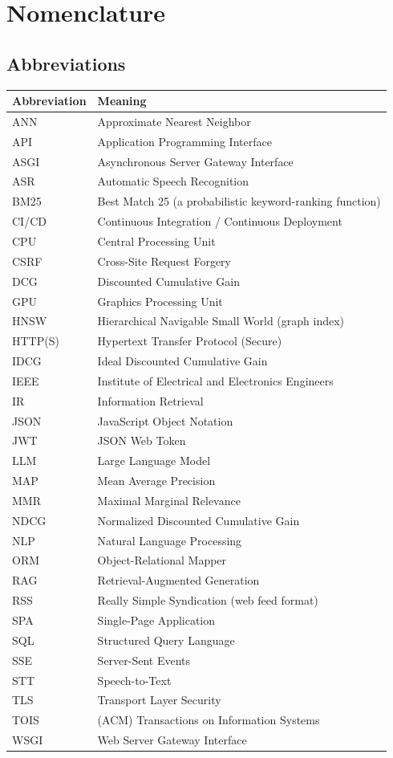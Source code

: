 \chapter*{Nomenclature}

\section*{Abbreviations}
\begin{longtable}{@{}p{4cm}p{10cm}@{}}
\toprule
\textbf{Abbreviation} & \textbf{Meaning} \\
\midrule
\endhead
ANN & Approximate Nearest Neighbor \\
API & Application Programming Interface \\
ASGI & Asynchronous Server Gateway Interface \\
ASR & Automatic Speech Recognition \\
BM25 & Best Match 25 (a probabilistic keyword-ranking function) \\
CI/CD & Continuous Integration / Continuous Deployment \\
CPU & Central Processing Unit \\
CSRF & Cross-Site Request Forgery \\
DCG & Discounted Cumulative Gain \\
GPU & Graphics Processing Unit \\
HNSW & Hierarchical Navigable Small World (graph index) \\
HTTP(S) & Hypertext Transfer Protocol (Secure) \\
IDCG & Ideal Discounted Cumulative Gain \\
IEEE & Institute of Electrical and Electronics Engineers \\
IR & Information Retrieval \\
JSON & JavaScript Object Notation \\
JWT & JSON Web Token \\
LLM & Large Language Model \\
MAP & Mean Average Precision \\
MMR & Maximal Marginal Relevance \\
NDCG & Normalized Discounted Cumulative Gain \\
NLP & Natural Language Processing \\
ORM & Object-Relational Mapper \\
RAG & Retrieval-Augmented Generation \\
RSS & Really Simple Syndication (web feed format) \\
SPA & Single-Page Application \\
SQL & Structured Query Language \\
SSE & Server-Sent Events \\
STT & Speech-to-Text \\
TLS & Transport Layer Security \\
TOIS & (ACM) Transactions on Information Systems \\
WSGI & Web Server Gateway Interface \\
\bottomrule
\end{longtable}

